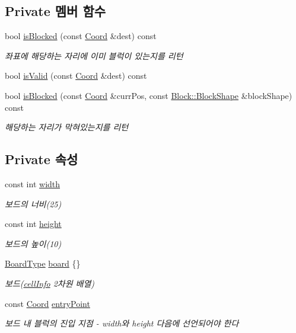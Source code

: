 \subsection*{Private 멤버 함수}
\begin{DoxyCompactItemize}
\item 
bool \mbox{\hyperlink{class_board_a61ff9b1284e5c3e1214a780361ed650b}{is\+Blocked}} (const \mbox{\hyperlink{struct_coord}{Coord}} \&dest) const
\begin{DoxyCompactList}\small\item\em 좌표에 해당하는 자리에 이미 블럭이 있는지를 리턴 \end{DoxyCompactList}\item 
bool \mbox{\hyperlink{class_board_a5df9c4c18c53b8029e0a080e5e089732}{is\+Valid}} (const \mbox{\hyperlink{struct_coord}{Coord}} \&dest) const
\item 
bool \mbox{\hyperlink{class_board_a1ba0d2a44e1469738220b5ff7dfda6fc}{is\+Blocked}} (const \mbox{\hyperlink{struct_coord}{Coord}} \&curr\+Pos, const \mbox{\hyperlink{class_block_aca5d951639f113e2ebd7856209d6b9ab}{Block\+::\+Block\+Shape}} \&block\+Shape) const
\begin{DoxyCompactList}\small\item\em 해당하는 자리가 막혀있는지를 리턴 \end{DoxyCompactList}\end{DoxyCompactItemize}
\subsection*{Private 속성}
\begin{DoxyCompactItemize}
\item 
const int \mbox{\hyperlink{class_board_a5c5b64d99e3c653c425206d2babf2f97}{width}}
\begin{DoxyCompactList}\small\item\em 보드의 너비(25) \end{DoxyCompactList}\item 
const int \mbox{\hyperlink{class_board_a37b65287f3b416ed31b0f15cfd9b3f7c}{height}}
\begin{DoxyCompactList}\small\item\em 보드의 높이(10) \end{DoxyCompactList}\item 
\mbox{\hyperlink{class_board_a84bf794bc185e31e333b78bb003c4bc3}{Board\+Type}} \mbox{\hyperlink{class_board_ad26aada4f19d2ca0c7bd534e8f466b6b}{board}} \{\}
\begin{DoxyCompactList}\small\item\em 보드(\mbox{\hyperlink{struct_board_1_1cell_info}{cell\+Info}} 2차원 배열) \end{DoxyCompactList}\item 
const \mbox{\hyperlink{struct_coord}{Coord}} \mbox{\hyperlink{class_board_a51d0b870dfe79367034bdda967e63a82}{entry\+Point}}
\begin{DoxyCompactList}\small\item\em 보드 내 블럭의 진입 지점 -\/ width와 height 다음에 선언되어야 한다 \end{DoxyCompactList}\end{DoxyCompactItemize}


